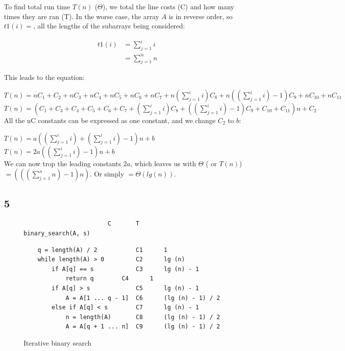 \documentclass[11pt,letterpaper]{article}
\begin{document}
To find total run time $T(n)$ ($\Theta$), we total the line costs (C) and how many times they are ran (T).
In the worse case, the array $A$ is in reverse order, so $t1(i) = $, all the lengths of the subarrays being
considered:

\begin{eqnarray}
	t1(i)  	&	= \sum_{j=1}^{i} i \\
			&	= \sum_{j=1}^{n} n
\end{eqnarray}

This leads to the equation:

$ 
T(n) = nC_1 + C_2 + nC_3 + nC_4 + nC_5 + nC_6 + nC_7 + n(\sum_{j=1}^{i} i)C_8 + n((\sum_{j=1}^{i} i) - 1)C_9 + nC_{10} + nC_{11} 
$\\

$
T(n) = ( C_1 + C_3 + C_4 + C_5 + C_6 + C_7 + (\sum_{j=1}^{i} i)C_8 + ((\sum_{j=1}^{i} i) - 1)C_9 + C_{10} + C_{11})n + C_2
$\\

All the nC constants can be expressed as one constant, and we change $C_2$ to $b$:

$
T(n) = a( (\sum_{j=1}^{i} i) + (\sum_{j=1}^{i} i) - 1)n + b
$\\

$
T(n) = 2a( (\sum_{j=1}^{i} i) - 1)n + b
$\\

We can now trop the leading constants $2a$, which leaves us with $\Theta$ ( or $T(n)$) 
$ = ( ( (\sum_{j=1}^{n} n) - 1)n )$. Or simply $ = \Theta(lg(n)) $.


\pagebreak


\subsection*{5}
\begin{figure}[!h]

\scriptsize
\begin{lstlisting}
						C 		T
binary_search(A, s)
\end{lstlisting}

\lstset{numbers=left}
\begin{lstlisting}
	q = length(A) / 2			C1		1
	while length(A) > 0			C2		lg (n)
		if A[q] == s 			C3		lg (n) - 1 
			return q		C4		1
		if A[q] > s 			C5		lg (n) - 1
			A = A[1 ... q - 1]	C6		(lg (n) - 1) / 2
		else if A[q] < s 		C7		lg (n) - 1
			n = length(A)		C8		(lg (n) - 1) / 2
			A = A[q + 1 ... n]	C9		(lg (n) - 1) / 2

\end{lstlisting}
\normalsize

\caption{Iterative binary search}
\label{binary_search}
\end{figure}
\end{document}
